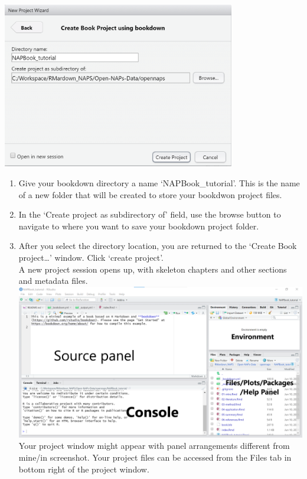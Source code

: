 \documentclass[
]{book}
\providecommand{\tightlist}{%
  \setlength{\itemsep}{0pt}\setlength{\parskip}{0pt}}
\let\origfigure\figure
\let\endorigfigure\endfigure
\renewenvironment{figure}[1][2] {
    \expandafter\origfigure\expandafter[H]
} {
    \endorigfigure
}
\begin{document}
\begin{figure}
\centering
\includegraphics[width=4in,height=\textheight]{tutorial_screenshots/open_bkdown_proj.png}
\caption{Create Bookdown project\ldots{}}
\end{figure}

\begin{enumerate}
\def\labelenumi{\arabic{enumi}.}
\setcounter{enumi}{3}
\tightlist
\item
  Give your bookdown directory a name `NAPBook\_tutorial'. This is the name of a new folder that will be created to store your bookdwon project files.\\
\item
  In the `Create project as subdirectory of' field, use the browse button to navigate to where you want to save your bookdown project folder.\\
\item
  After you select the directory location, you are returned to the `Create Book project\ldots{}' window. Click `create project'.\\
  A new project session opens up, with skeleton chapters and other sections and metadata files.\\
  \includegraphics{tutorial_screenshots/bkdn_proj_window_label.png}\\
  Your project window might appear with panel arrangements different from mine/in screenshot. Your project files can be accessed from the Files tab in bottom right of the project window.
\end{enumerate}
\end{document}
